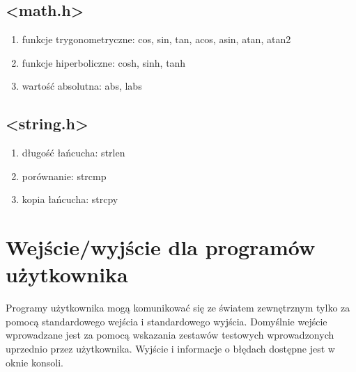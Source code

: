 \documentclass[a4paper,twoside,openright,11pt]{report}
\begin{document}
  \section {<math.h>}
    \begin{enumerate}
      \item funkcje trygonometryczne: cos, sin, tan, acos, asin, atan, atan2
      \item funkcje hiperboliczne: cosh, sinh, tanh
      \item wartość absolutna: abs, labs
    \end{enumerate}
  \section {<string.h>}
    \begin{enumerate}
      \item długość łańcucha: strlen
      \item porównanie: strcmp
      \item kopia łańcucha: strcpy
    \end{enumerate}

  \chapter {Wejście/wyjście dla programów użytkownika}
  \par Programy użytkownika mogą komunikować się ze światem zewnętrznym tylko za pomocą standardowego wejścia i standardowego wyjścia. Domyślnie wejście wprowadzane jest za pomocą wskazania zestawów testowych wprowadzonych uprzednio przez użytkownika. Wyjście i informacje o błędach dostępne jest w oknie konsoli.
\end{document}
